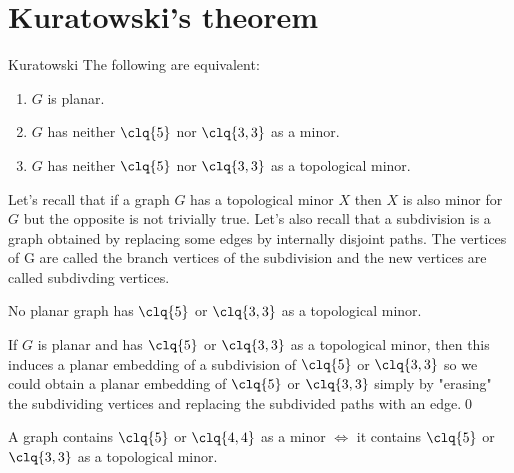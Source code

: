 \section*{Kuratowski's theorem}
\begin{customtheorem}{Kuratowski}
\label{theorem:kuratowski}
    The following are equivalent:
    \begin{enumerate}
        \item $G$ is planar.
        \item $G$ has neither $\clq{5}$ nor $\clq{3, 3}$ as a minor.
        \item $G$ has neither $\clq{5}$ nor $\clq{3, 3}$ as a topological minor.
    \end{enumerate}
\end{customtheorem}
Let's recall that if a graph $G$ has a topological minor $X$ then $X$ is also minor for $G$ but the opposite is not trivially true. Let's also recall that a subdivision is a graph obtained by replacing some edges by internally disjoint paths. The vertices of G are called the branch vertices of the subdivision and the new vertices are called subdivding vertices.
\begin{customlemma}{4.14}
\label{lemma:4.14}
    No planar graph has $\clq{5}$ or $\clq{3, 3}$ as a topological minor.
\end{customlemma}
\begin{prf}
    If $G$ is planar and has $\clq{5}$ or $\clq{3, 3}$ as a topological minor, then this induces a planar embedding of a subdivision of $\clq{5}$ or $\clq{3, 3}$ so we could obtain a planar embedding of $\clq{5}$ or $\clq{3, 3}$ simply by "erasing" the subdividing vertices and replacing the subdivided paths with an edge.\qed
\end{prf}
\begin{customlemma}{4.15}
\label{lemma:4.15}
    A graph contains $\clq{5}$ or $\clq{4, 4}$ as a minor $\iff$ it contains $\clq{5}$ or $\clq{3, 3}$ as a topological minor.
\end{customlemma}
